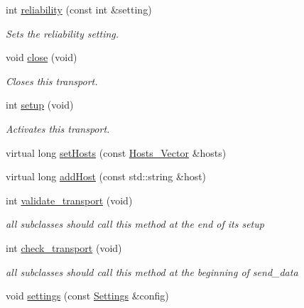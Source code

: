 \begin{DoxyCompactItemize}
int \hyperlink{classMadara_1_1Transport_1_1Splice__DDS__Transport_a90ce968a882c149ec10d39fbcb4b273d}{reliability} (const int \&setting)
\begin{DoxyCompactList}\small\item\em Sets the reliability setting. \item\end{DoxyCompactList}\item 
void \hyperlink{classMadara_1_1Transport_1_1Splice__DDS__Transport_af849dda81ea906f7ddbb14e268cea6d4}{close} (void)
\begin{DoxyCompactList}\small\item\em Closes this transport. \item\end{DoxyCompactList}\item 
int \hyperlink{classMadara_1_1Transport_1_1Splice__DDS__Transport_ac766cc269d8dbf6406ce6617cb0afe09}{setup} (void)
\begin{DoxyCompactList}\small\item\em Activates this transport. \item\end{DoxyCompactList}\item 
virtual long \hyperlink{classMadara_1_1Transport_1_1Base_aede3e2606396c38455966e155875976d}{setHosts} (const \hyperlink{classMadara_1_1Transport_1_1Base_a2957ae0c413e07b7e276ae69ef1c320a}{Hosts\_\-Vector} \&hosts)
\item 
virtual long \hyperlink{classMadara_1_1Transport_1_1Base_ad2d54b9bb188231988a7e7ac89976d30}{addHost} (const std::string \&host)
\item 
int \hyperlink{classMadara_1_1Transport_1_1Base_a6d31f20d785b8b5a798c20db3975247b}{validate\_\-transport} (void)
\begin{DoxyCompactList}\small\item\em all subclasses should call this method at the end of its setup \item\end{DoxyCompactList}\item 
int \hyperlink{classMadara_1_1Transport_1_1Base_af4ce175b7152c0c3666e128cbbe96e97}{check\_\-transport} (void)
\begin{DoxyCompactList}\small\item\em all subclasses should call this method at the beginning of send\_\-data \item\end{DoxyCompactList}\item 
void \hyperlink{classMadara_1_1Transport_1_1Base_a3a5fdc2b43d9840dbcf48aab4bc636ac}{settings} (const \hyperlink{classMadara_1_1Transport_1_1Settings}{Settings} \&config)

\end{DoxyCompactItemize}
